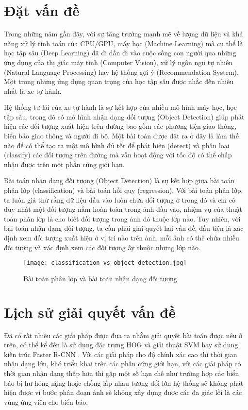 \documentclass[../thesis.tex]{subfiles}
\begin{document}
\renewcommand*\thesection{\arabic{section}}

\section{Đặt vấn đề}

Trong những năm gần đây, với sự tăng trưởng mạnh mẽ về lượng dữ liệu và khả năng xử lý tính toán của CPU/GPU, máy học (Machine Learning) mà cụ thể là học tập sâu (Deep Learning) đã đi dần đi vào cuộc sống con người qua những ứng dụng của thị giác máy tính (Computer Vision), xử lý ngôn ngữ tự nhiên (Natural Language Processing) hay hệ thống gợi ý (Recommendation System). Một trong những ứng dụng quan trọng của học tập sâu được nhắc đến nhiều nhất là xe tự hành.

Hệ thống tự lái của xe tự hành là sự kết hợp của nhiều mô hình máy học, học tập sâu, trong đó có mô hình nhận dạng đối tượng (Object Detection) giúp phát hiện các đối tượng xuất hiện trên đường bao gồm các phương tiện giao thông, biển báo giao thông và người đi bộ. Một bài toán được đặt ra ở đây là làm thế nào để có thể tạo ra một mô hình đủ tốt để phát hiện (detect) và phân loại (classify) các đối tượng trên đường mà vẫn hoạt động với tốc độ có thể chấp nhận được trên một phần cứng giới hạn.  

Bài toán nhận dạng đối tượng (Object Detection) là sự kết hợp giữa bài toán phân lớp (classification) và bài toán hồi quy (regression). Với bài toán phân lớp, ta luôn giả thử rằng dữ liệu đầu vào luôn chứa đối tượng ở trong đó và chỉ có duy nhất một đối tượng nằm hoàn toàn trong ảnh đầu vào, nhiệm vụ của thuật toán phân lớp là cho biết đối tượng trong ảnh đó thuộc lớp nào. Tuy nhiên, với bài toán nhận dạng đối tượng, ta cần phải giải quyết hai vấn đề, đầu tiên là xác định xem đối tượng xuất hiện ở vị trí nào trên ảnh, mỗi ảnh có thể chứa nhiều đối tượng và xác định xem các đối tượng ấy thuộc những lớp nào.

\begin{figure}[H]
    \centering
    \texttt{[image: classification\_vs\_object\_detection.jpg]}
    \caption{Bài toán phân lớp và bài toán nhận dạng đối tượng}\label{classification_vs_object_detection}
\end{figure}

\section{Lịch sử giải quyết vấn đề}

Đã có rất nhiều các giải pháp được đưa ra nhằm giải quyết bài toán được nêu ở trên, có thể kể đến là sử dụng đặc trưng HOG và giải thuật SVM \cite{hog-tqbao-thchen-tqdinh} hay sử dụng kiến trúc Faster R-CNN \cite{faster-rcnn-nngbao-dldien}. Với các giải pháp cho độ chính xác cao \cite{faster-rcnn-nngbao-dldien} thì thời gian nhận dạng lớn, khó triển khai trên các phần cứng giới hạn, với các giải pháp có thời gian nhận dạng thấp hơn \cite{hog-tqbao-thchen-tqdinh} thì gặp một số hạn chế như trường hợp các biển báo bị hư hỏng nặng hoặc chồng lấp nhau tương đối lớn hệ thống sẽ không phát hiện được vì bước phân đoạn ảnh sẽ không xây dựng được các đa giác lồi là các vùng ứng viên cho biển báo.
\end{document}
